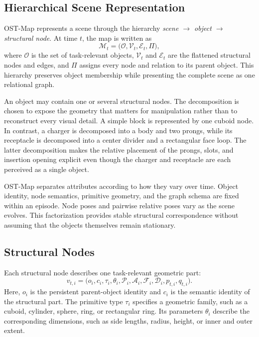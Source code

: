 \subsection{Hierarchical Scene Representation}
\label{app:ost_map_hierarchy}

OST-Map represents a scene through the hierarchy
\emph{scene $\rightarrow$ object $\rightarrow$ structural node}. At time $t$,
the map is written as
\begin{equation}
    \mathcal{M}_t
    =
    \bigl(
    \mathcal{O},
    \mathcal{V}_t,
    \mathcal{E}_t,
    \Pi
    \bigr),
    \label{eq:ost_map_concrete}
\end{equation}
where $\mathcal{O}$ is the set of task-relevant objects,
$\mathcal{V}_t$ and $\mathcal{E}_t$ are the flattened structural nodes and
edges, and $\Pi$ assigns every node and relation to its parent object. This
hierarchy preserves object membership while presenting the complete scene as
one relational graph.

An object may contain one or several structural nodes. The decomposition is
chosen to expose the geometry that matters for manipulation rather than to
reconstruct every visual detail. A simple block is represented by one cuboid
node. In contrast, a charger is decomposed into a body and two prongs, while
its receptacle is decomposed into a center divider and a rectangular face
loop. The latter decomposition makes the relative placement of the prongs,
slots, and insertion opening explicit even though the charger and receptacle
are each perceived as a single object.

OST-Map separates attributes according to how they vary over time.
Object identity, node semantics, primitive geometry, and the graph schema are
fixed within an episode. Node poses and pairwise relative poses vary as the
scene evolves. This factorization provides stable structural correspondence
without assuming that the objects themselves remain stationary.

\subsection{Structural Nodes}
\label{app:ost_map_nodes}

Each structural node describes one task-relevant geometric part:
\begin{equation}
    v_{t,i}
    =
    \bigl(
    o_i,
    c_i,
    \tau_i,
    \theta_i,
    \mathcal{P}_i,
    \mathcal{A}_i,
    \mathcal{F}_i,
    \mathcal{D}_i,
    p_{t,i},
    q_{t,i}
    \bigr).
    \label{eq:ost_map_node_full}
\end{equation}
Here, $o_i$ is the persistent parent-object identity and $c_i$ is the semantic
identity of the structural part. The primitive type $\tau_i$ specifies a
geometric family, such as a cuboid, cylinder, sphere, ring, or rectangular
ring. Its parameters $\theta_i$ describe the corresponding dimensions, such
as side lengths, radius, height, or inner and outer extent.

